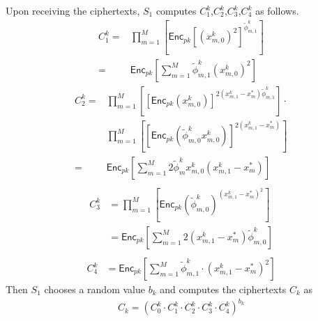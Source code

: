 \documentclass[conference]{IEEEtran}
\begin{document}
Upon receiving the ciphertexts, $S_1$ computes $C_1^k$,$C_2^k$,$C_3^k$,$C_4^k$ as follows.
\begin{equation}
  \begin{split}
  C_1^k = &\prod_{m=1}^M\left[ \mathsf{Enc}_{pk}{\left[\left(x_{m,0}^k\right)^2\right]}^{\tilde{\phi}_{m,1}^k} \right] \\
  = &\mathsf{Enc}_{pk}\left[ \sum_{m=1}^M \tilde{\phi}_{m,1}^k \left(x_{m,0}^k\right)^2\right]
  \end{split}
\end{equation}
\begin{equation}
  \begin{split}
  C_2^k = & \prod_{m=1}^M\left[ \left[\mathsf{Enc}_{pk}\left(x_{m,0}^k\right)\right]^{2\left(x_{m,1}^k - x_m^*\right)\tilde{\phi}_{m,1}^k}\right] \cdot \\
          & \prod_{m=1}^M\left[ \left[\mathsf{Enc}_{pk}\left(\tilde{\phi}_{m,0}^k x_{m,0}^k\right)\right]^{2\left(x_{m,1}^k - x_m^*\right)} \right] \\
          = & \mathsf{Enc}_{pk}\left[\sum_{m=1}^M 2\tilde{\phi}_m^k x_{m,0}^k\left(x_{m,1}^k - x_m^*\right)\right]  \\
  \end{split}
\end{equation}
\begin{equation}
  \begin{split}
    C_3^k & = \prod_{m=1}^M\left[ \mathsf{Enc}_{pk}\left(\tilde{\phi}_{m,0}^k\right)^{\left(x_{m,1}^k - x_m^*\right)^2} \right] \\
    & = \mathsf{Enc}_{pk}\left[\sum_{m=1}^M 2\left(x_{m,1}^k - x_m^*\right)\tilde{\phi}_{m,0}^k\right] \\
  \end{split}
\end{equation}
\begin{equation}
  \begin{split}
    C_4^k & = \mathsf{Enc}_{pk}\left[\sum_{m=1}^M \tilde{\phi}_{m,1}^k \cdot \left(x_{m,1}^k - x_m^*\right)^2\right]
  \end{split}
\end{equation}
Then $S_1$ chooses a random value $b_k$ and computes the ciphertexts $C_k$ as 
\begin{equation}
  \begin{split}
    C_k = \left(C_0^k\cdot C_1^k\cdot C_2^k\cdot C_3^k \cdot C_4^k\right)^{b_k}
  \end{split}
\end{equation}
\end{document}
